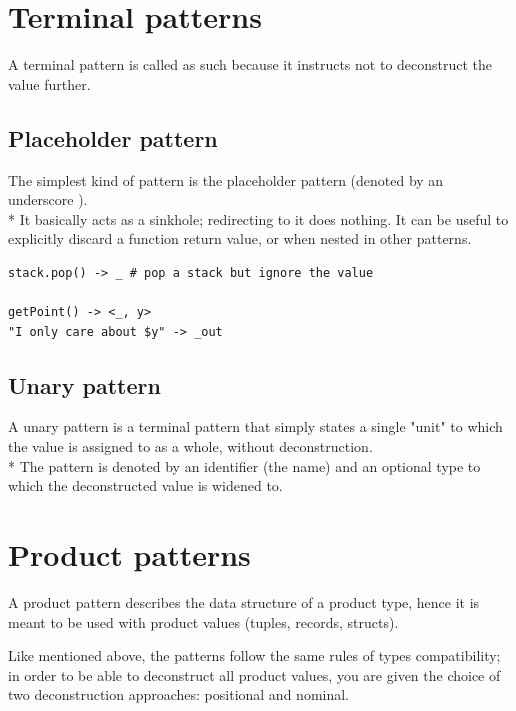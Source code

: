\clearpage

\section{Terminal patterns}

A terminal pattern is called as such because it instructs not to deconstruct
the value further.

\subsection{Placeholder pattern}

The simplest kind of pattern is the placeholder pattern (denoted by an
underscore \code{\_}).\\*
It basically acts as a sinkhole; redirecting to it does nothing. It can be
useful to explicitly discard a function return value, or when nested in other
patterns.

\begin{verbatim}
stack.pop() -> _ # pop a stack but ignore the value

getPoint() -> <_, y>
"I only care about $y" -> _out
\end{verbatim}

\subsection{Unary pattern}
A unary pattern is a terminal pattern that simply states a single "unit" to
which the value is assigned to as a whole, without deconstruction.\\*
The pattern is denoted by an identifier (the name) and an optional type to
which the deconstructed value is widened to.\footnotemark[1]


\clearpage

\section{Product patterns}

A product pattern describes the data structure of a product type, hence it is
meant to be used with product values (tuples, records, structs).

Like mentioned above, the patterns follow the same rules of types
compatibility; in order to be able to deconstruct all product values, you are
given the choice of two deconstruction approaches: positional and nominal.

